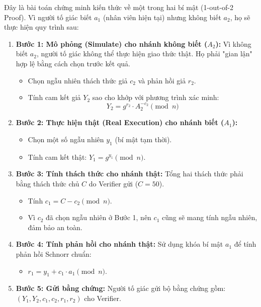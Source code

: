 Đây là bài toán chứng minh kiến thức về một trong hai bí mật (1-out-of-2 Proof). Vì người tố giác biết $a_1$ (nhân viên hiện tại) nhưng không biết $a_2$, họ sẽ thực hiện quy trình sau:
\begin{enumerate}
    \item \textbf{Bước 1: Mô phỏng (Simulate) cho nhánh không biết ($A_2$):}
    Vì không biết $a_2$, người tố giác không thể thực hiện giao thức thật. Họ phải "gian lận" hợp lệ bằng cách chọn trước kết quả.
    \begin{itemize}
        \item Chọn ngẫu nhiên thách thức giả $c_2$ và phản hồi giả $r_2$.
        \item Tính cam kết giả $Y_2$ sao cho khớp với phương trình xác minh:
        \[
        Y_2 = g^{r_2} \cdot A_2^{-c_2} \pmod{n}
        \]
    \end{itemize}
    
    \item \textbf{Bước 2: Thực hiện thật (Real Execution) cho nhánh biết ($A_1$):}
    \begin{itemize}
        \item Chọn một số ngẫu nhiên $y_1$ (bí mật tạm thời).
        \item Tính cam kết thật: $Y_1 = g^{y_1} \pmod{n}$.
    \end{itemize}
    
    \item \textbf{Bước 3: Tính thách thức cho nhánh thật:}
    Tổng hai thách thức phải bằng thách thức chủ $C$ do Verifier gửi ($C=50$).
    \begin{itemize}
        \item Tính $c_1 = C - c_2 \pmod{n}$.
        \item Vì $c_2$ đã chọn ngẫu nhiên ở Bước 1, nên $c_1$ cũng sẽ mang tính ngẫu nhiên, đảm bảo an toàn.
    \end{itemize}
    
    \item \textbf{Bước 4: Tính phản hồi cho nhánh thật:}
    Sử dụng khóa bí mật $a_1$ để tính phản hồi Schnorr chuẩn:
    \begin{itemize}
        \item $r_1 = y_1 + c_1 \cdot a_1 \pmod{n}$.
    \end{itemize}
    
    \item \textbf{Bước 5: Gửi bằng chứng:}
    Người tố giác gửi bộ bằng chứng gồm: $(Y_1, Y_2, c_1, c_2, r_1, r_2)$ cho Verifier.
\end{enumerate}


